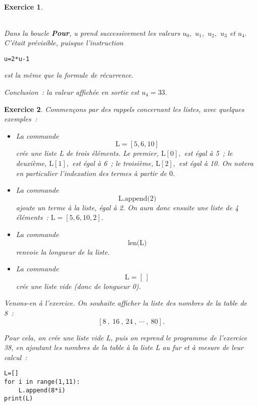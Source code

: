\documentclass[10pt]{article}
\newtheorem{exo}{Exercice}
\begin{document}
\begin{exo}
\begin{multicols}{3}
\begin{center}
\begin{tabular}{|c|cc|}
\end{tabular}
\end{center}


\end{multicols}


\medskip

Dans la boucle \textbf{Pour}, u prend successivement les valeurs $u_0,$ $u_1,$ $u_2,$ $u_3$ et $u_4.$ C'était prévisible, puisque l'instruction \begin{lstlisting}
u=2*u-1
\end{lstlisting} est la même que la formule de récurrence.

\medskip

Conclusion~: la valeur affichée en sortie est $u_4=33.$

\end{exo}

\begin{exo}

Commençons par des rappels concernant les listes, avec quelques exemples~:

\begin{itemize}
\item[\textbullet] La commande \[\text{L}=\left[5,6,10\right]\] crée une liste L de trois éléments. Le premier, $\text{L}\left[0\right],$ est égal à 5~; le deuxième, $\text{L}\left[1\right],$ est égal à 6~; le troisième, $\text{L}\left[2\right],$ est égal à 10. On notera en particulier l'indexation des termes  à partir de $0.$
\item[\textbullet] La commande \[\text{L.append(2)}\] ajoute un terme à la liste, égal à 2. On aura donc ensuite une liste de 4 éléments~: $\text{L}=\left[5,6,10,2\right].$
\item[\textbullet] La commande \[\text{len(L)}\] renvoie la longueur de la liste.
\item[\textbullet] La commande \[\text{L}=\left[~\right]\] crée une liste vide (donc de longueur 0).
\end{itemize}

\medskip

Venons-en à l'exercice. On souhaite afficher la liste des nombres de la table de 8~:
\[\left[8~,~16~,~24~,~\cdots~,~80\right].\]

Pour cela, on crée une liste vide L, puis on reprend le programme de l'exercice 38, en ajoutant les nombres de la table à la liste L au fur et à mesure de leur calcul~:

\medskip

\begin{lstlisting}
L=[]
for i in range(1,11):
	L.append(8*i)
print(L)
\end{lstlisting}



\end{exo}
\end{document}
